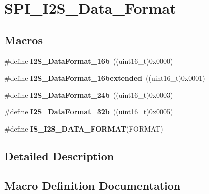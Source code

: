 \hypertarget{group___s_p_i___i2_s___data___format}{}\section{S\+P\+I\+\_\+\+I2\+S\+\_\+\+Data\+\_\+\+Format}
\label{group___s_p_i___i2_s___data___format}
\subsection*{Macros}
\begin{DoxyCompactItemize}
\item 
\mbox{\label{group___s_p_i___i2_s___data___format_gabcd7cb799b68346a735709cc135bd414}} 
\#define {\bfseries I2\+S\+\_\+\+Data\+Format\+\_\+16b}~((uint16\+\_\+t)0x0000)
\item 
\mbox{\label{group___s_p_i___i2_s___data___format_gae44b9704c9e393d5abec9bf4fcfe1116}} 
\#define {\bfseries I2\+S\+\_\+\+Data\+Format\+\_\+16bextended}~((uint16\+\_\+t)0x0001)
\item 
\mbox{\label{group___s_p_i___i2_s___data___format_ga5a959486671cf00c5a734f1df205581b}} 
\#define {\bfseries I2\+S\+\_\+\+Data\+Format\+\_\+24b}~((uint16\+\_\+t)0x0003)
\item 
\mbox{\label{group___s_p_i___i2_s___data___format_ga6be3bdcc713cb92a9ad247de013a5e37}} 
\#define {\bfseries I2\+S\+\_\+\+Data\+Format\+\_\+32b}~((uint16\+\_\+t)0x0005)
\item 
\#define {\bfseries I\+S\+\_\+\+I2\+S\+\_\+\+D\+A\+T\+A\+\_\+\+F\+O\+R\+M\+AT}(F\+O\+R\+M\+AT)
\end{DoxyCompactItemize}


\subsection{Detailed Description}


\subsection{Macro Definition Documentation}
\mbox{\label{group___s_p_i___i2_s___data___format_gac467da829eca4a5c4ce41a6abd2d8e81}} 
